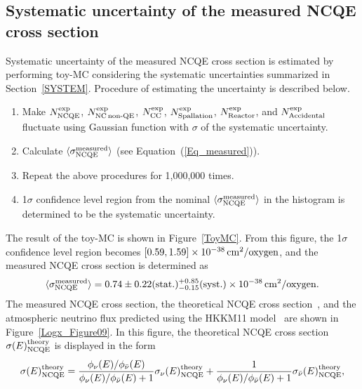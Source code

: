 \subsection{Systematic uncertainty of the measured NCQE cross section}
\vs\hs
Systematic uncertainty of the measured NCQE cross section is estimated by performing toy-MC considering the systematic uncertainties summarized in Section~\ref{SYSTEM}.
Procedure of estimating the uncertainty is described below.
\begin{enumerate}
	\item Make $N^{\rm exp}_{\rm NCQE}$, $N^{\rm exp}_{\rm NC\,non\mathchar`-QE}$, $N^{\rm exp}_{\rm CC}$, $N^{\rm exp}_{\rm Spallation}$, $N^{\rm exp}_{\rm Reactor}$, and $N^{\rm exp}_{\rm Accidental}$ fluctuate using Gaussian function with $\sigma$ of the systematic uncertainty.
	\item Calculate $\langle \sigma^{\rm measured}_{\rm NCQE} \rangle$ (see Equation~(\ref{Eq_measured})).
	\item Repeat the above procedures for 1,000,000 times.
	\item 1$\sigma$ confidence level region from the nominal $\langle \sigma^{\rm measured}_{\rm NCQE} \rangle$ in the histogram is determined to be the systematic uncertainty.
\end{enumerate}
The result of the toy-MC is shown in Figure~\ref{ToyMC}.
From this figure, the 1$\sigma$ confidence level region becomes $[0.59, 1.59] \times 10^{-38}\,{\rm cm}^{2}/{\rm oxygen}$, and the measured NCQE cross section is determined as
\begin{eqnarray}
	\langle \sigma^{{\rm measured}}_{{\rm NCQE}} \rangle = 0.74 \pm 0.22 ({\rm stat.})^{+0.85}_{-0.15}({\rm syst.}) \times 10^{-38}\,{\rm cm}^{2}/{\rm oxygen}.
\end{eqnarray}
\hs
The measured NCQE cross section, the theoretical NCQE cross section~\cite{2012Ankowski}, and the atmospheric neutrino flux predicted using the HKKM11 model~\cite{2011Honda} are shown in Figure~\ref{Logx_Figure09}.
In this figure, the theoretical NCQE cross section $\sigma(E)^{\rm theory}_{\rm NCQE}$ is displayed in the form
\begin{eqnarray}
	\sigma(E)^{\rm theory}_{\rm NCQE} = {\phi_{\nu}(E)/\phi_{\bar{\nu}}(E) \over \phi_{\nu}(E)/\phi_{\bar{\nu}}(E) + 1}\sigma_{\nu}(E)^{\rm theory}_{\rm NCQE} + {1 \over \phi_{\nu}(E)/\phi_{\bar{\nu}}(E) + 1}\sigma_{\bar{\nu}}(E)^{\rm theory}_{\rm NCQE},
\end{eqnarray}
